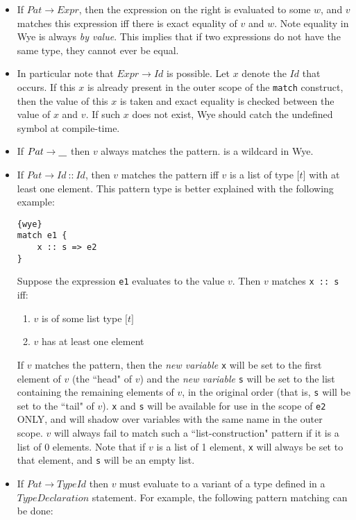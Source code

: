\documentclass[a4paper, 12pt]{article}
\newcommand{\uscore}{\underline{\hspace{0.3cm}}}
\begin{document}
\begin{itemize}
\item If $Pat \to Expr$, then the expression on the right is evaluated to some $w$, and $v$ matches this expression iff there is exact equality of $v$ and $w$. Note equality in Wye is always \textit{by value}. This implies that if two expressions do not have the same type, they cannot ever be equal.
\item In particular note that $Expr \to Id$ is possible. Let $x$ denote the $Id$ that occurs. If this $x$ is already present in the outer scope of the \texttt{match} construct, then the value of this $x$ is taken and exact equality is checked between the value of $x$ and $v$. If such $x$ does not exist, Wye should catch the undefined symbol at compile-time.
\item If $Pat \to \uscore$ then $v$ always matches the pattern. \uscore{} is a wildcard in Wye.
\item If $Pat \to Id \:\texttt{::}\: Id$, then $v$ matches the pattern iff $v$ is a list of type $\texttt{[}t\texttt{]}$ with at least one element. This pattern type is better explained with the following example:
\begin{lstlisting}{wye}
match e1 {
	x :: s => e2
}
\end{lstlisting}
Suppose the expression \texttt{e1} evaluates to the value $v$. Then $v$ matches \texttt{x :: s} iff:
\begin{enumerate}
\item $v$ is of some list type $\texttt{[}t\texttt{]}$
\item $v$ has at least one element
\end{enumerate}
If $v$ matches the pattern, then the \textit{new variable} \texttt{x} will be set to the first element of $v$ (the ``head" of $v$) and the \textit{new variable} \texttt{s} will be set to the list containing the remaining elements of $v$, in the original order (that is, \texttt{s} will be set to the ``tail" of $v$). \texttt{x} and \texttt{s} will be available for use in the scope of \texttt{e2} ONLY, and will shadow over variables with the same name in the outer scope. $v$ will always fail to match such a ``list-construction" pattern if it is a list of 0 elements. Note that if $v$ is a list of 1 element, \texttt{x} will always be set to that element, and \texttt{s} will be an empty list.
\item If $Pat \to TypeId$ then $v$ must evaluate to a variant of a type defined in a $TypeDeclaration$ statement. For example, the following pattern matching can be done:

\end{itemize}
\end{document}
